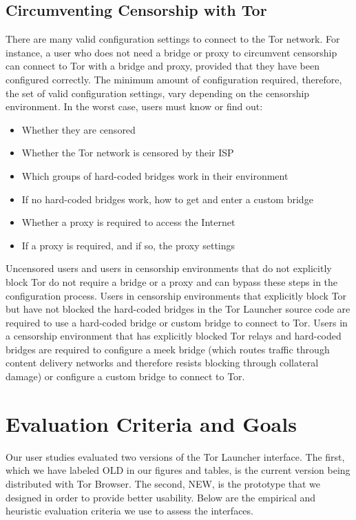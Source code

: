\documentclass[USenglish,oneside,twocolumn]{article}
\begin{document}
\subsection{Circumventing Censorship with Tor}
There are many valid configuration settings to connect to the Tor network.
For instance, a user who does not need a bridge or proxy to circumvent censorship
can connect to Tor with a bridge and proxy, provided that they have been configured correctly. 
The minimum amount of configuration required, therefore, the set of valid configuration settings,
vary depending on the censorship environment. In the worst case, users must know or find out:\\

\begin{itemize}
	\item{Whether they are censored} 
	\item{Whether the Tor network is censored by their ISP}
	\item{Which groups of hard-coded bridges work in their environment} 
	\item{If no hard-coded bridges work, how to get and enter a custom bridge} 
	\item{Whether a proxy is required to access the Internet}
	\item{If a proxy is required, and if so, the proxy settings}
\end{itemize}

Uncensored users and users in censorship environments that do not explicitly 
block Tor do not require a bridge or a proxy and can bypass these steps in the configuration process.
Users in censorship environments that explicitly block Tor but have not blocked the 
hard-coded bridges in the Tor Launcher source code are required to use a 
hard-coded bridge or custom bridge to connect to Tor. Users in a censorship environment that has explicitly 
blocked Tor relays and hard-coded bridges are required to configure a meek bridge (which 
routes traffic through content delivery networks and therefore resists blocking through collateral damage) or 
configure a custom bridge to connect to Tor.


\section{Evaluation Criteria and Goals}
\label{sec:goals}
Our user studies evaluated two versions of the Tor Launcher interface.
The first, which we have labeled OLD in our figures and tables,
is the current version being distributed with Tor Browser.
The second, NEW, is the prototype that we designed
in order to provide better usability. Below are the empirical and 
heuristic evaluation criteria we use to assess the interfaces. 
\end{document}
